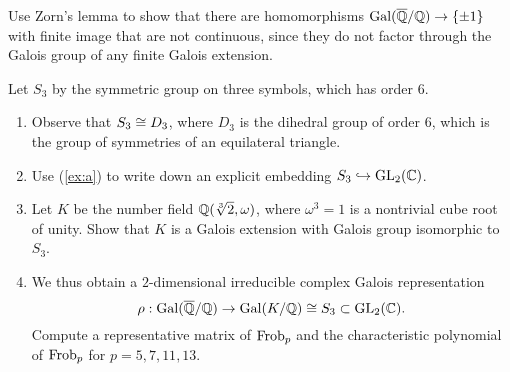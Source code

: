 {\begin{exercise}
  \begin{hint}
    Use Zorn's lemma to show that there are homomorphisms
    $\operatorname{Gal}(\overline{\mathbb{Q}}/\mathbb{Q})\to\{\pm 1\}$ with finite image that are not continuous,
    since they do not factor through the Galois group of any
    finite Galois extension.
  \end{hint}

\end{exercise}

\begin{exercise}
  Let $S_3$ by the symmetric group on three symbols, which has order $6$.
  \begin{enumerate}
    \item \label{ex:a} Observe that $S_3\cong D_3$, where $D_3$ is
    the dihedral group of order $6$, which is the group of symmetries of
    an equilateral triangle.
    \item Use (\ref{ex:a}) to write down an explicit
    embedding $S_3 \hookrightarrow \operatorname{GL}_2(\mathbb{C})$.
    \item Let $K$ be the number field $\mathbb{Q}(\sqrt[3]{2},\omega)$,
    where $\omega^3=1$ is a nontrivial cube root of unity.  Show
    that $K$ is a Galois extension with Galois group isomorphic to~$S_3$.
    \item We thus obtain a $2$-dimensional irreducible complex
    Galois representation
    \[
      \rho:\operatorname{Gal}(\overline{\mathbb{Q}}/\mathbb{Q}) \to \operatorname{Gal}(K/\mathbb{Q}) \cong S_3 \subset \operatorname{GL}_2(\mathbb{C}).
    \]
    Compute a representative matrix of $\operatorname{Frob}_p$ and the characteristic polynomial
    of $\operatorname{Frob}_p$ for $p=5,7,11,13$.
  \end{enumerate}
\end{exercise}

}
